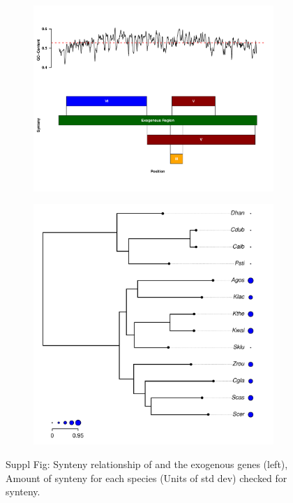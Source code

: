 \documentclass[12pt]{article}
\begin{document}
\begin{figure}[h]
    \centering
    \begin{subfigure}
        \centering
        \includegraphics[width=.45\textwidth]{img/synteny_blocks_and_gc.pdf}
    \end{subfigure}
    \begin{subfigure}
        \centering
        \includegraphics[width=.45\textwidth]{img/synteny_coverage.pdf}
    \end{subfigure}
    \caption{Suppl Fig: Synteny relationship of \gossypii and the exogenous genes (left), Amount of synteny for each species (Units of std dev) checked for synteny.}
    \label{fig:synteny_species}
\end{figure}
\end{document}
